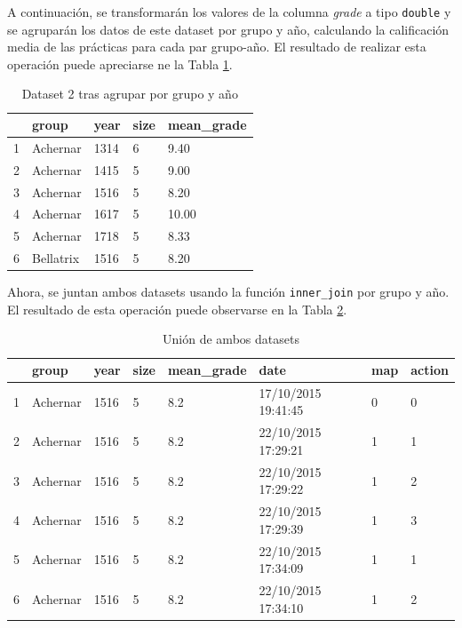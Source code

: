 A continuación, se transformarán los valores de la columna \emph{grade} a tipo \texttt{double} y se agruparán los datos de este dataset por grupo y año, calculando la calificación media de las prácticas para cada par grupo-año. El resultado de realizar esta operación puede apreciarse ne la Tabla \ref{table:9}.

\begin{table}[ht]
\centering
\begin{tabular}{rllll}
  \hline
 & group & year & size & mean\_grade \\ 
  \hline
1 & Achernar & 1314 & 6 &  9.40 \\ 
  2 & Achernar & 1415 & 5 &  9.00 \\ 
  3 & Achernar & 1516 & 5 &  8.20 \\ 
  4 & Achernar & 1617 & 5 & 10.00 \\ 
  5 & Achernar & 1718 & 5 &  8.33 \\ 
  6 & Bellatrix & 1516 & 5 &  8.20 \\ 
   \hline
\end{tabular}
\caption{Dataset 2 tras agrupar por grupo y año}
\label{table:9}
\end{table}

Ahora, se juntan ambos datasets usando la función \texttt{inner\_join} por grupo y año. El resultado de esta operación puede observarse en la Tabla \ref{table:10}.

\begin{table}[ht]
\centering
\begin{tabular}{rlllllll}
  \hline
 & group & year & size & mean\_grade & date & map & action \\ 
  \hline
1 & Achernar & 1516 & 5 & 8.2 & 17/10/2015 19:41:45 & 0 & 0 \\ 
  2 & Achernar & 1516 & 5 & 8.2 & 22/10/2015 17:29:21 & 1 & 1 \\ 
  3 & Achernar & 1516 & 5 & 8.2 & 22/10/2015 17:29:22 & 1 & 2 \\ 
  4 & Achernar & 1516 & 5 & 8.2 & 22/10/2015 17:29:39 & 1 & 3 \\ 
  5 & Achernar & 1516 & 5 & 8.2 & 22/10/2015 17:34:09 & 1 & 1 \\ 
  6 & Achernar & 1516 & 5 & 8.2 & 22/10/2015 17:34:10 & 1 & 2 \\ 
   \hline
\end{tabular}
\caption{Unión de ambos datasets}
\label{table:10}
\end{table}

